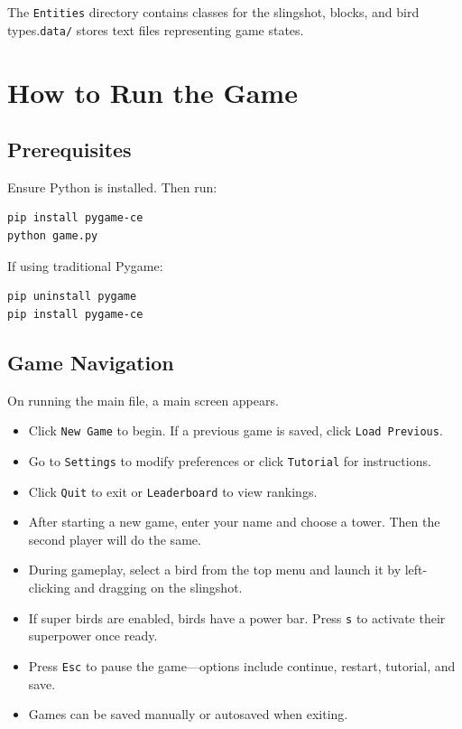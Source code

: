 \documentclass[10pt]{article}
\begin{document}
The \texttt{Entities} directory contains classes for the slingshot, blocks, and bird types.\texttt{data/} stores text files representing game states.

\section{How to Run the Game}\label{sec:running-instructions}

\subsection{Prerequisites}
Ensure Python is installed. Then run:
\begin{verbatim}
pip install pygame-ce
python game.py
\end{verbatim}

If using traditional Pygame:
\begin{verbatim}
pip uninstall pygame
pip install pygame-ce
\end{verbatim}

\subsection{Game Navigation}
On running the main file, a main screen appears.
\begin{itemize}
    \item Click \texttt{New Game} to begin. If a previous game is saved, click \texttt{Load Previous}.
    \item Go to \texttt{Settings} to modify preferences or click \texttt{Tutorial} for instructions.
    \item Click \texttt{Quit} to exit or \texttt{Leaderboard} to view rankings.
    \item After starting a new game, enter your name and choose a tower. Then the second player will do the same.
    \item During gameplay, select a bird from the top menu and launch it by left-clicking and dragging on the slingshot.
    \item If super birds are enabled, birds have a power bar. Press \texttt{s} to activate their superpower once ready.
    \item Press \texttt{Esc} to pause the game—options include continue, restart, tutorial, and save.
    \item Games can be saved manually or autosaved when exiting.
\end{itemize}
\end{document}
